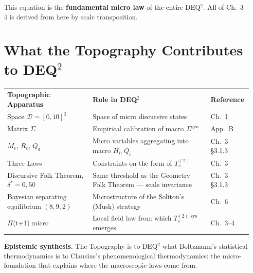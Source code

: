 \Proved{} This equation is the \textbf{fundamental micro law} of the
entire DEQ$^2$. All of Ch.~3--4 is derived from here by scale
transposition.

\section{What the Topography Contributes to
DEQ$^2$}\label{topography-contribution-deq2}

{\def\LTcaptype{none} %
{\small\begin{longtable}[]{@{}
  >{\raggedright\arraybackslash}p{}
  >{\raggedright\arraybackslash}p{}
  >{\raggedright\arraybackslash}p{}@{}}
\toprule\noalign{}
\begin{minipage}[b]{\linewidth}\raggedright
Topographic Apparatus
\end{minipage} & \begin{minipage}[b]{\linewidth}\raggedright
Role in DEQ$^2$
\end{minipage} & \begin{minipage}[b]{\linewidth}\raggedright
Reference
\end{minipage} \\
\midrule\noalign{}
\endhead
\bottomrule\noalign{}
\endlastfoot
Space \(\mathcal{D} = [0, 10]^3\) & Space of micro discursive states
& Ch.~1 \\
Matrix \(\Sigma\) & Empirical calibration of macro \(\Sigma^{\text{geo}}\)
& App.~B \\
\(M_e\), \(R_c\), \(Q_0\) & Micro variables aggregating into macro
\(H_i, Q_i\) & Ch.~3 \S{}3.1.3 \\
Three Laws & Constraints on the form of \(T_s^{(2)}\) & Ch.~3 \\
Discursive Folk Theorem, \(\delta^* = 0{,}50\) & Same threshold as the
Geometry Folk Theorem --- scale invariance & Ch.~3 \S{}3.1.3 \\
Bayesian separating equilibrium \((8, 9, 2)\) & Microstructure of the
Soliton's (Musk) strategy & Ch.~6 \\
$\Pi$(t+1) micro & Local field law from which \(T_s^{(2),\text{sys}}\)
emerges & Ch.~3--4 \\
\end{longtable}}
}

\Hypoth{} \textbf{Epistemic synthesis.} The Topography is to DEQ$^2$
what Boltzmann's statistical thermodynamics is to Clausius's
phenomenological thermodynamics: the micro-foundation that explains where
the macroscopic laws come from.

